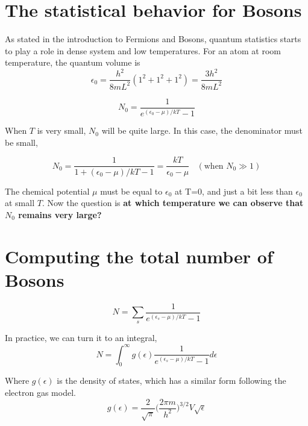 
\section{The statistical behavior for Bosons}
As stated in the introduction to Fermions and Bosons, quantum statistics starts to play a role in dense system and low temperatures. For an atom at room temperature, the quantum volume is
\begin{equation}
\epsilon_0 = \frac{h^2}{8mL^2}(1^2+1^2+1^2) = \frac{3h^2}{8mL^2}
\end{equation}

\begin{equation}
N_0 = \frac{1}{e^{(\epsilon_0-\mu)/kT}-1}
\end{equation}

When $T$ is very small, $N_0$ will be quite large. In this case, the denominator must be small,

\begin{equation}
N_0 = \frac{1}{1+(\epsilon_0-\mu)/kT-1} = \frac{kT}{\epsilon_0-\mu}  ~~~~(\textrm{when~} N_0 \gg 1)
\end{equation}

The chemical potential $\mu$ must be equal to $\epsilon_0$ at T=0, and just a bit less than $\epsilon_0$ at small $T$. %
Now the question is \textbf{at which temperature we can observe that $N_0$ remains very large?}


\section{Computing the total number of Bosons}
\begin{equation}
N = \sum_s \frac{1}{e^{(\epsilon_s-\mu)/kT}-1}
\end{equation}

In practice, we can turn it to an integral,
\begin{equation}
\label{eq0}
N = \int_0^\infty g(\epsilon)\frac{1}{e^{(\epsilon_s-\mu)/kT}-1}d\epsilon
\end{equation}

Where $g(\epsilon)$ is the density of states, which has a similar form following the electron gas model. 
\begin{equation}
g(\epsilon) = \frac{2}{\sqrt{\pi}}\bigg(\frac{2\pi m}{h^2}\bigg)^{3/2}V\sqrt{\epsilon}
\end{equation}


